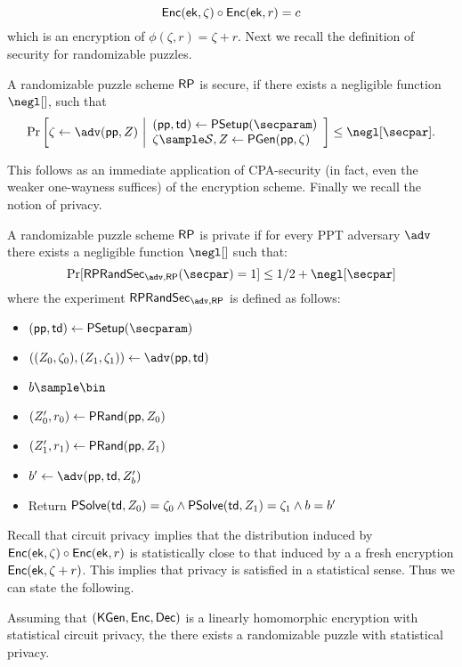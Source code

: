 $$
{\mathsf{Enc}}(\mathsf{ek}, \zeta) \circ {\mathsf{Enc}}(\mathsf{ek}, r) = c 
$$
which is an encryption of $\phi(\zeta, r) = \zeta + r$. Next we recall the definition of security for randomizable puzzles.
\begin{definition}[Security]
\label{def:rp-sec}
A randomizable puzzle scheme $\mathsf{RP}$ is secure, if there exists a negligible function 
$\negl[]$, such that
\[
	\Pr\left[
	\zeta \gets \adv(\pparam, Z)
	~\middle\vert
	\begin{array}{l}
	(\pparam, \td) \gets \psetup(\secparam) \\
	\zeta \sample \solspace, Z \gets \pgen(\pparam, \zeta)
	\end{array}
	\right] \leq \negl[\secpar].
\]
\end{definition}
This follows as an immediate application of CPA-security (in fact, even the weaker one-wayness suffices) of the encryption scheme. Finally we recall the notion of privacy.
\begin{definition}[Privacy]
\label{def:rp-privacy}
A randomizable puzzle scheme $\mathsf{RP}$ is private if for every PPT adversary $\adv$ there exists a negligible function $\negl[]$ such that:
$$\Pr[\RPUnlink_{\adv, \RP}(\secpar) = 1] \leq 1/2 + \negl[\secpar]$$ where the experiment 
$\RPUnlink_{\adv, \RP}$ is defined as follows: 
\begin{itemize}
    \item $(\pparam,\td) \gets \psetup(\secparam)$
	\item $((Z_0, \zeta_0), (Z_1, \zeta_1)) \gets \adv(\pparam, \td)$
	\item $b \sample \bin$
	\item $(Z_0', r_0) \gets \mathsf{PRand}(\mathsf{pp}, Z_0)$ 
	\item $(Z_1', r_1) \gets \mathsf{PRand}(\mathsf{pp}, Z_1)$
	\item $b' \gets \adv(\pparam, \td, Z_b')$
	\item Return $\mathsf{PSolve}(\mathsf{td}, Z_0) = \zeta_0 \land \mathsf{PSolve}(\mathsf{td}, Z_1) = \zeta_1 \\ \land b = b'$
\end{itemize}
\end{definition}
Recall that circuit privacy implies that the distribution induced by 
${\mathsf{Enc}}(\mathsf{ek},\allowbreak \zeta) \circ {\mathsf{Enc}}(\mathsf{ek}, r)$ is statistically close to that induced by a a fresh encryption ${\mathsf{Enc}}(\mathsf{ek}, \zeta + r)$. This implies that privacy is satisfied in a statistical sense. Thus we can state the following.
\begin{lemma}
Assuming that $({\mathsf{KGen}}, {\mathsf{Enc}}, {\mathsf{Dec}})$ is a linearly homomorphic encryption with statistical circuit privacy, the there exists a randomizable puzzle with statistical privacy.
\end{lemma}